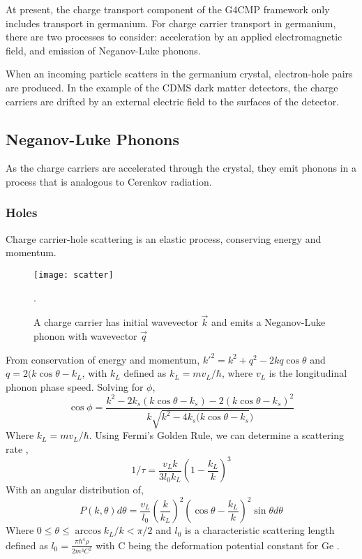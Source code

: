At present, the charge transport component of the G4CMP framework only includes
transport in germanium. For charge carrier transport in germanium, there are
two processes to consider: acceleration by an applied electromagnetic field,
and emission of Neganov-Luke phonons.

When an incoming particle scatters in the germanium crystal, electron-hole
pairs are produced. In the example of the CDMS dark matter detectors, the
charge carriers are drifted by an external electric field to the surfaces of
the detector. 

\subsection{Neganov-Luke Phonons}
As the charge carriers are accelerated through the crystal, they emit phonons
in a process that is analogous to Cerenkov radiation.
\subsubsection{Holes}
Charge carrier-hole scattering is an elastic process, conserving energy and
momentum.

\begin{figure}[htpb]
    \centering
    \texttt{[image: scatter]}
    \caption{A charge carrier has initial wavevector $\vec{k}$ and emits a
    Neganov-Luke phonon with wavevector $\vec{q}$ \cite{Leman}}.
    \label{fig:scatter}
\end{figure}

From conservation of energy and momentum, $k'^2 = k^2 + q^2 - 2kq\cos{\theta}$
and $q = 2(k\cos{\theta} - k_L$, with $k_L$ defined as $k_L = mv_L/\hbar$,
where $v_L$ is the longitudinal phonon phase speed. Solving for $\phi$,
\begin{equation}
    \cos{\phi} = \frac{k^2 - 2k_s(k\cos{\theta} - k_s) - 2(k\cos{\theta} -
k_s)^2}{k\sqrt{k^2 - 4k_s(k\cos{\theta} - k_s})}
    \label{eq:scatterangle}
\end{equation}
Where $k_L = mv_L/\hbar$. Using Fermi's Golden Rule, we can determine a
scattering rate \cite{Leman},
\begin{equation}
    1/\tau = \frac{v_Lk}{3l_0k_L}\left(1-\frac{k_L}{k}\right)^3
    \label{eq:rate}
\end{equation}
With an angular distribution of,
\begin{equation}
    P(k,\theta) d\theta =
    \frac{v_L}{l_0}\left(\frac{k}{k_L}\right)^2\left(\cos{\theta}-\frac{k_L}{k}\right)^2\sin{\theta}d\theta
    \label{eq:ang-dist}
\end{equation}
Where $0\le\theta\le\arccos{k_L/k}<\pi/2$ and $l_0$ is a characteristic
scattering length defined as $l_0 = \frac{\pi\hbar^4\rho}{2m^3C^2}$ with C
being the deformation potential constant for Ge \cite{Leman}.

